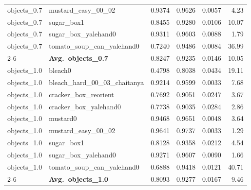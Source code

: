 \begin{longtable}{llrrrr}
  objects_0.7 & mustard\_easy\_00\_02 & 0.9374 & 0.9626 & 0.0057 & 4.23 \\
  objects_0.7 & sugar\_box1 & 0.8455 & 0.9280 & 0.0106 & 10.07 \\
  objects_0.7 & sugar\_box\_yalehand0 & 0.9311 & 0.9603 & 0.0088 & 1.79 \\
  objects_0.7 & tomato\_soup\_can\_yalehand0 & 0.7240 & 0.9486 & 0.0084 & 36.99 \\
  \cmidrule{2-6}
  & \textbf{Avg.~objects_0.7} & 0.8247 & 0.9235 & 0.0146 & 10.05 \\
  \midrule
  objects_1.0 & bleach0 & 0.4798 & 0.8038 & 0.0434 & 19.11 \\
  objects_1.0 & bleach\_hard\_00\_03\_chaitanya & 0.9214 & 0.9599 & 0.0033 & 7.68 \\
  objects_1.0 & cracker\_box\_reorient & 0.7692 & 0.9051 & 0.0247 & 3.67 \\
  objects_1.0 & cracker\_box\_yalehand0 & 0.7738 & 0.9035 & 0.0284 & 2.86 \\
  objects_1.0 & mustard0 & 0.9468 & 0.9651 & 0.0048 & 3.64 \\
  objects_1.0 & mustard\_easy\_00\_02 & 0.9641 & 0.9737 & 0.0033 & 1.29 \\
  objects_1.0 & sugar\_box1 & 0.8128 & 0.9358 & 0.0212 & 4.54 \\
  objects_1.0 & sugar\_box\_yalehand0 & 0.9271 & 0.9607 & 0.0090 & 1.66 \\
  objects_1.0 & tomato\_soup\_can\_yalehand0 & 0.6888 & 0.9418 & 0.0121 & 40.71 \\
  \cmidrule{2-6}
  & \textbf{Avg.~objects_1.0} & 0.8093 & 0.9277 & 0.0167 & 9.46 \\
  \midrule
\bottomrule
\end{longtable}